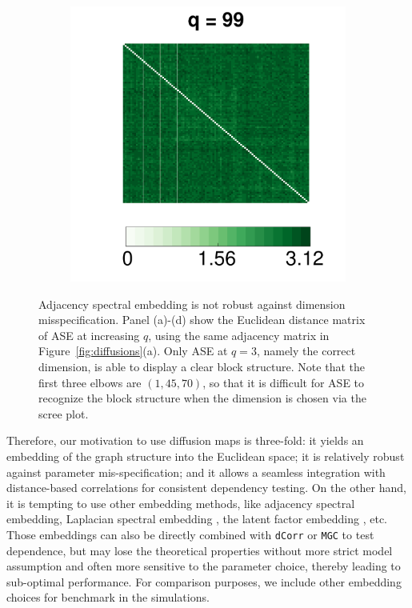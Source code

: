 \documentclass[11pt]{article}
\theoremstyle{definition}
\begin{document}
\begin{figure}[!ht]
\begin{subfigure}[b]{0.23\textwidth}
	\caption{}
	\label{fig:e10}
	\end{subfigure}
	\begin{subfigure}[b]{0.23\textwidth}
	\includegraphics[width=\textwidth]{../Figure/E99.pdf}
	\caption{}
	\label{fig:e99}
	\end{subfigure}
	\caption{Adjacency spectral embedding is not robust against dimension misspecification. Panel (a)-(d) show the Euclidean distance matrix of ASE at increasing $q$, using the same adjacency matrix in Figure~\ref{fig:diffusions}(a). Only ASE at $q=3$, namely the correct dimension, is able to display a clear block structure. Note that the first three elbows are $(1,45,70)$, so that it is difficult for ASE to recognize the block structure when the dimension is chosen via the scree plot.}
\label{fig:embedding}
\end{figure}

Therefore, our motivation to use diffusion maps is three-fold: it yields an embedding of the graph structure into the Euclidean space; it is relatively robust against parameter mis-specification; and it allows a seamless integration with distance-based correlations for consistent dependency testing. On the other hand, it is tempting to use other embedding methods, like adjacency spectral embedding, Laplacian spectral embedding \cite{rohe2011spectral}, the latent factor embedding \cite{fosdick2015testing}, etc. Those embeddings can also be directly combined with \texttt{dCorr} or \texttt{MGC} to test dependence, but may lose the theoretical properties without more strict model assumption and often more sensitive to the parameter choice, thereby leading to sub-optimal performance. For comparison purposes, we include other embedding choices for benchmark in the simulations.
\end{document}

